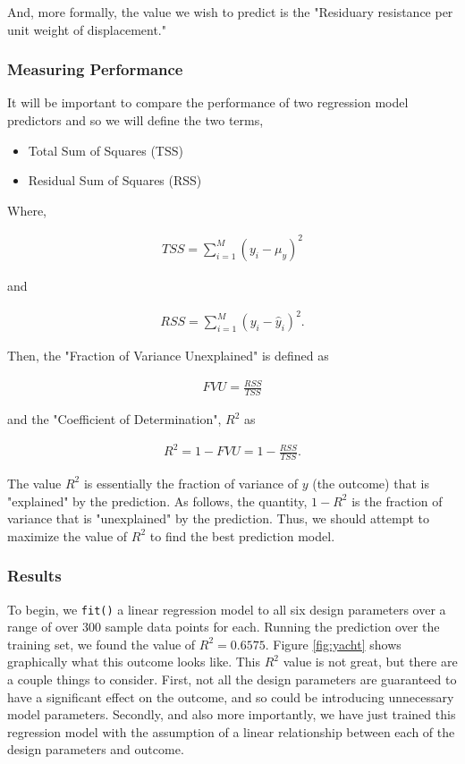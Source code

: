 \documentclass[11pt,a4paper]{article}
\begin{document}
And, more formally, the value we wish to predict is the "Residuary resistance per unit weight of displacement."

\subsubsection{Measuring Performance}
It will be important to compare the performance of two regression model predictors and so we will define the two terms,

\begin{itemize}
\item Total Sum of Squares (TSS)
\item Residual Sum of Squares (RSS)
\end{itemize}

Where,

\begin{align*}
TSS = \sum_{i=1}^M (y_i - \mu_y)^2
\end{align*}

and

\begin{align*}
RSS = \sum_{i=1}^M (y_i - \hat{y}_i)^2.
\end{align*}

Then, the "Fraction of Variance Unexplained" is defined as

\begin{align*}
FVU = \frac{RSS}{TSS}
\end{align*}

and the "Coefficient of Determination", $R^2$ as

\begin{align*}
R^2 = 1 - FVU = 1 - \frac{RSS}{TSS}.
\end{align*}

The value $R^2$ is essentially the fraction of variance of $y$ (the outcome) that is "explained" by the prediction. As follows, the quantity, $1-R^2$ is the fraction of variance that is "unexplained" by the prediction. Thus, we should attempt to maximize the value of $R^2$ to find the best prediction model.

\subsubsection{Results}
To begin, we \verb|fit()| a linear regression model to all six design parameters over a range of over 300 sample data points for each. Running the prediction over the training set, we found the value of $R^2 = 0.6575$. Figure \ref{fig:yacht} shows graphically what this outcome looks like. This $R^2$ value is not great, but there are a couple things to consider. First, not all the design parameters are guaranteed to have a significant effect on the outcome, and so could be introducing unnecessary model parameters. Secondly, and also more importantly, we have just trained this regression model with the assumption of a linear relationship between each of the design parameters and outcome.
\end{document}
